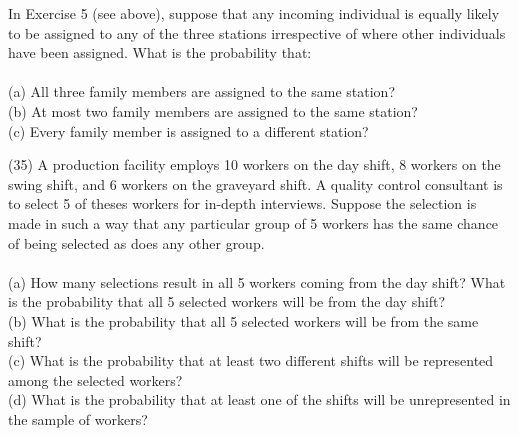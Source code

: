 \documentclass[12pt,letterpaper]{hmcpset}
\begin{document}
\begin{solution}

\end{solution}
\newpage

\begin{problem}[2.2.28]
In Exercise 5 (see above), suppose that any incoming individual is equally likely to be assigned to any of the three stations irrespective of where other individuals have been assigned. What is the probability that:
\\ \\
(a) All three family members are assigned to the same station?
\\
(b) At most two family members are assigned to the same station?
\\
(c) Every family member is assigned to a different station?

\end{problem}

\begin{solution}

\end{solution}
\newpage
\begin{problem}[2.3.35]
(35) A production facility employs 10 workers on the day shift, 8 workers on the swing shift, and 6 workers on the graveyard shift. A quality control consultant is to select 5 of theses workers for in-depth interviews. Suppose the selection is made in such a way that any particular group of 5 workers has the same chance of being selected as does any other group.
\\ \\
(a) How many selections result in all 5 workers coming from the day shift? What is the probability that all 5 selected workers will be from the day shift?
\\
(b) What is the probability that all 5 selected workers will be from the same shift?
\\
(c) What is the probability that at least two different shifts will be represented among the selected workers?
\\
(d) What is the probability that at least one of the shifts will be unrepresented in the sample of workers?

\end{problem}
\end{document}
